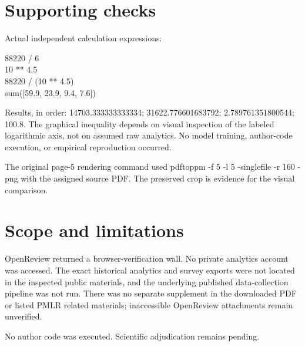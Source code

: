 \documentclass[10pt]{article}
\begin{document}
\section*{Supporting checks}
Actual independent calculation expressions:\par
{\ttfamily\footnotesize 88220 / 6\\
10 ** 4.5\\
88220 / (10 ** 4.5)\\
sum([59.9, 23.9, 9.4, 7.6])}\par
Results, in order: 14703.333333333334; 31622.776601683792; 2.789761351800544; 100.8. The graphical inequality depends on visual inspection of the labeled logarithmic axis, not on assumed raw analytics. No model training, author-code execution, or empirical reproduction occurred.\par
The original page-5 rendering command used pdftoppm -f 5 -l 5 -singlefile -r 160 -png with the assigned source PDF. The preserved crop is evidence for the visual comparison.\par
\section*{Scope and limitations}
OpenReview returned a browser-verification wall. No private analytics account was accessed. The exact historical analytics and survey exports were not located in the inspected public materials, and the underlying published data-collection pipeline was not run. There was no separate supplement in the downloaded PDF or listed PMLR related materials; inaccessible OpenReview attachments remain unverified.\par
No author code was executed. Scientific adjudication remains pending.\par
\end{document}
